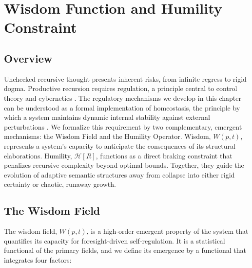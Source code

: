 \chapter{Wisdom Function and Humility Constraint}
\label{ch:wisdom_function_and_humility_constraint}


\section{Overview}

Unchecked recursive thought presents inherent risks, from infinite regress to rigid dogma. Productive recursion requires regulation, a principle central to control theory and cybernetics \autocite{Kalman1960, AndersonMoore1990, Wiener1948, Ashby1952}. The regulatory mechanisms we develop in this chapter can be understood as a formal implementation of homeostasis, the principle by which a system maintains dynamic internal stability against external perturbations \autocite{Cannon1932}. We formalize this requirement by two complementary, emergent mechanisms: the Wisdom Field and the Humility Operator. Wisdom, \(W(p,t)\), represents a system's capacity to anticipate the consequences of its structural elaborations. Humility, \(\mathcal{H}[R]\), functions as a direct braking constraint that penalizes recursive complexity beyond optimal bounds. Together, they guide the evolution of adaptive semantic structures away from collapse into either rigid certainty or chaotic, runaway growth.


\section{The Wisdom Field}
\label{sec:the_wisdom_field}

The wisdom field, \(W(p, t)\), is a high-order emergent property of the system that quantifies its capacity for foresight-driven self-regulation. It is a statistical functional of the primary fields, and we define its emergence by a functional that integrates four factors:

